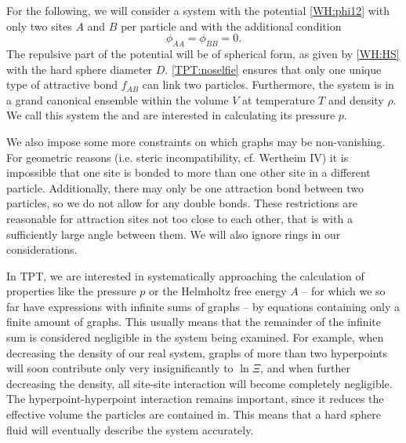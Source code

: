 \documentclass[8.5pt,twoside,twocolumn]{article}
\theoremstyle{standard}
\begin{document}
For the following, we will consider a system with the potential \eqref{WH:phi12}
with only two sites $A$ and $B$ per particle and with the additional condition
\begin{equation}
\phi_{AA}=\phi_{BB}=0.
\label{TPT:noselfie}
\end{equation} 
The repulsive part of the potential will be of spherical form, as given by \eqref{WH:HS}
with the hard sphere diameter $D$. \eqref{TPT:noselfie} ensures that only one unique type
of attractive bond $f_{AB}$ can link two particles. Furthermore, the system is in a
grand canonical ensemble within the volume $V$ at temperature $T$ and density $\rho$.
We call this system the  and are interested in calculating its pressure $p$. 

We also impose some more constraints on which graphs may be non-vanishing. For
geometric reasons (i.e. steric incompatibility, cf. Wertheim IV\cite{Wertheim4})
it is impossible that one site is bonded to more than one other site in a
different particle. Additionally, there may only be one attraction bond between
two particles, so we do not allow for any double bonds. These restrictions are
reasonable for attraction sites not too close to each other, that is with a
sufficiently large angle between them. We will also ignore rings in our
considerations.

In TPT, we are interested in systematically approaching the calculation of properties like
the pressure $p$ or the Helmholtz free energy $A$ -- for which we so far have expressions
with infinite sums of graphs -- by equations containing only a finite amount of graphs.
This usually means that the remainder of the infinite sum is considered negligible in the
system being examined. For example, when decreasing the density of our real system, graphs of
more than two hyperpoints will soon contribute only very insignificantly to $\ln\Xi$, and when further
decreasing the density, all site-site interaction will become completely negligible.
The hyperpoint-hyperpoint interaction remains important, since it reduces the
effective volume the particles are contained in. This means that a hard sphere fluid will
eventually describe the system accurately.
\end{document}
